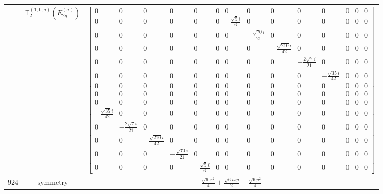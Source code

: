 \documentclass[fleqn,8pt,landscape]{jsarticle}
\begin{document}
\begin{longtable}{ccc}
$  $ & $ \mathbb{T}_{2}^{(1,0;a)}(E_{2g}^{(a)}) $ & $ \begin{bmatrix} 0 & 0 & 0 & 0 & 0 & 0 & 0 & 0 & 0 & 0 & 0 & 0 & 0 & 0 \\ 0 & 0 & 0 & 0 & 0 & 0 & - \frac{\sqrt{5} i}{6} & 0 & 0 & 0 & 0 & 0 & 0 & 0 \\ 0 & 0 & 0 & 0 & 0 & 0 & 0 & - \frac{\sqrt{70} i}{21} & 0 & 0 & 0 & 0 & 0 & 0 \\ 0 & 0 & 0 & 0 & 0 & 0 & 0 & 0 & - \frac{\sqrt{210} i}{42} & 0 & 0 & 0 & 0 & 0 \\ 0 & 0 & 0 & 0 & 0 & 0 & 0 & 0 & 0 & - \frac{2 \sqrt{7} i}{21} & 0 & 0 & 0 & 0 \\ 0 & 0 & 0 & 0 & 0 & 0 & 0 & 0 & 0 & 0 & - \frac{\sqrt{35} i}{42} & 0 & 0 & 0 \\ 0 & 0 & 0 & 0 & 0 & 0 & 0 & 0 & 0 & 0 & 0 & 0 & 0 & 0 \\ 0 & 0 & 0 & 0 & 0 & 0 & 0 & 0 & 0 & 0 & 0 & 0 & 0 & 0 \\ 0 & 0 & 0 & 0 & 0 & 0 & 0 & 0 & 0 & 0 & 0 & 0 & 0 & 0 \\ - \frac{\sqrt{35} i}{42} & 0 & 0 & 0 & 0 & 0 & 0 & 0 & 0 & 0 & 0 & 0 & 0 & 0 \\ 0 & - \frac{2 \sqrt{7} i}{21} & 0 & 0 & 0 & 0 & 0 & 0 & 0 & 0 & 0 & 0 & 0 & 0 \\ 0 & 0 & - \frac{\sqrt{210} i}{42} & 0 & 0 & 0 & 0 & 0 & 0 & 0 & 0 & 0 & 0 & 0 \\ 0 & 0 & 0 & - \frac{\sqrt{70} i}{21} & 0 & 0 & 0 & 0 & 0 & 0 & 0 & 0 & 0 & 0 \\ 0 & 0 & 0 & 0 & - \frac{\sqrt{5} i}{6} & 0 & 0 & 0 & 0 & 0 & 0 & 0 & 0 & 0 \end{bmatrix} $ \\ \hline
$ 924 $ & $ \text{symmetry} $ & $ \frac{\sqrt{6} x^{2}}{4} + \frac{\sqrt{6} i x y}{2} - \frac{\sqrt{6} y^{2}}{4} $ \\

\end{longtable}
\end{document}
